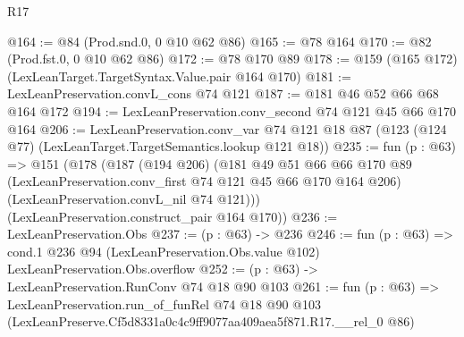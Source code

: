 \begin{lexlean}{R17}
\begin{coremodule}
@164 := @84 (Prod.snd.{0, 0} @10 @62 @86)
@165 := @78 @164
@170 := @82 (Prod.fst.{0, 0} @10 @62 @86)
@172 := @78 @170 @89
@178 := @159 (@165 @172) (LexLeanTarget.TargetSyntax.Value.pair @164 @170)
@181 := LexLeanPreservation.convL_cons @74 @121
@187 := @181 @46 @52 @66 @68 @164 @172
@194 := LexLeanPreservation.conv_second @74 @121 @45 @66 @170 @164
@206 := LexLeanPreservation.conv_var
    @74
    @121
    @18
    @87
    (@123 (@124 @77) (LexLeanTarget.TargetSemantics.lookup @121 @18))
@235 := fun (p : @63) =>
  @151
    (@178
      (@187
        (@194 @206)
        (@181
          @49
          @51
          @66
          @66
          @170
          @89
          (LexLeanPreservation.conv_first @74 @121 @45 @66 @170 @164 @206)
          (LexLeanPreservation.convL_nil @74 @121)))
      (LexLeanPreservation.construct_pair @164 @170))
@236 := LexLeanPreservation.Obs
@237 := (p : @63) -> @236
@246 := fun (p : @63) =>
  cond.{1} @236 @94 (LexLeanPreservation.Obs.value @102) LexLeanPreservation.Obs.overflow
@252 := (p : @63) -> LexLeanPreservation.RunConv @74 @18 @90 @103
@261 := fun (p : @63) =>
  LexLeanPreservation.run_of_funRel
    @74
    @18
    @90
    @103
    (LexLeanPreserve.Cf5d8331a0c4c9ff9077aa409aea5f871.R17.__rel_0 @86)
\end{coremodule}
\end{lexlean}
